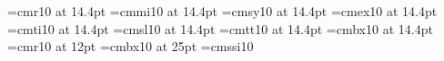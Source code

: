%

\font\fteenrm=cmr10 at 14.4pt
\font\fteeni=cmmi10 at 14.4pt
\font\fteensy=cmsy10 at 14.4pt
\font\fteenex=cmex10 at 14.4pt
\font\fteenit=cmti10 at 14.4pt
\font\fteensl=cmsl10 at 14.4pt
\font\fteentt=cmtt10 at 14.4pt
\font\fteenbf=cmbx10 at 14.4pt
\font\twelverm=cmr10 at 12pt
\font\ttlfont=cmbx10 at 25pt
\font\amfont=cmssi10 %

\def\tenpoint{\def\rm{\fam0\tenrm}%
  \textfont0=\tenrm  \scriptfont0=\sevenrm  \scriptscriptfont0=\fiverm
  \textfont1=\teni   \scriptfont1=\seveni   \scriptscriptfont1=\fivei
  \textfont2=\tensy  \scriptfont2=\sevensy  \scriptscriptfont2=\fivesy
  \textfont3=\tenex  \scriptfont3=\tenex    \scriptscriptfont3=\tenex
  \textfont\itfam=\tenit   \def\it{\fam\itfam\tenit}%
  \textfont\slfam=\tensl   \def\sl{\fam\slfam\tensl}%
  \textfont\ttfam=\tentt   \def\tt{\fam\ttfam\tentt}%
  \textfont\bffam=\tenbf   \scriptfont\bffam=\sevenbf
     \scriptscriptfont\bffam=\fivebf   \def\bf{\fam\bffam\tenbf}%
  \tt %
  \let\ss=\tensy      \let\af=\tensy
  \normalbaselineskip=15pt minus0.25pt
  \def\parsdef{12.5pt plus 3pt minus 4pt}
  \def\parslitl{3pt plus 2pt minus 1pt}
  \def\parid{20pt}
  \def\paril{35pt}
  \parindent\parid\parskip\parsdef
  \setbox\strutbox=\hbox{\vrule height 8.5pt depth 3.5pt width 0pt}%
  \let\sc=\eightrm \let\big=\tenbig  \normalbaselines\rm}

